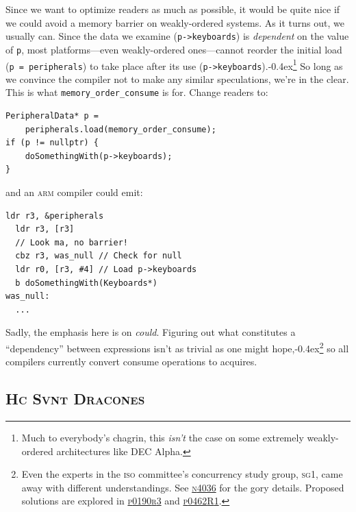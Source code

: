 \documentclass[fontsize=10pt, numbers=endperiod]{scrartcl}
\newcommand{\codesize}{\fontsize{10pt}{12pt}}
\newcommand{\punckern}{\kern-0.4ex}
\newcommand{\monobox}[1]{\mbox{\texttt{#1}}}
\newenvironment{colfigure}
  {\par\vspace{1\baselineskip minus 0.5\baselineskip}\noindent\minipage{\linewidth}}
  {\endminipage\vspace*{1\baselineskip minus 0.7\baselineskip}}
\begin{document}
\begin{multicols}{2}
Since we want to optimize readers as much as possible,
it would be quite nice if we could avoid a memory barrier
on weakly-ordered systems.
As it turns out, we usually can.
Since the data we examine (\texttt{p->keyboards})
is \emph{dependent} on the value of \texttt{p},
most platforms---even weakly-ordered ones---cannot reorder the initial
load (\texttt{p = peripherals}) to take place after its use
(\texttt{p->keyboards}).\punckern\footnote{Much to everybody's chagrin,
this \emph{isn't} the case on some extremely weakly-ordered architectures like
DEC Alpha.}
So long as we convince the compiler not to make any similar speculations,
we're in the clear.
This is what \monobox{memory\_order\_consume} is for.
Change readers to:
\begin{colfigure}
\begin{verbatim}
PeripheralData* p =
    peripherals.load(memory_order_consume);
if (p != nullptr) {
    doSomethingWith(p->keyboards);
}
\end{verbatim}
\end{colfigure}
and an \textsc{arm} compiler could emit:
\begin{colfigure}
\begin{lstlisting}[language={[ARM]Assembler}]
  ldr r3, &peripherals
  ldr r3, [r3]
  // Look ma, no barrier!
  cbz r3, was_null // Check for null
  ldr r0, [r3, #4] // Load p->keyboards
  b doSomethingWith(Keyboards*)
was_null:
  ...
\end{lstlisting}
\end{colfigure}

Sadly, the emphasis here is on \emph{could}.
Figuring out what constitutes a ``dependency'' between expressions isn't
as trivial as one might hope,\punckern\footnote{Even the experts in
the \textsc{iso} committee's concurrency study group, \textsc{sg}1,
came away with different understandings.
See
\href{http://www.open-std.org/jtc1/sc22/wg21/docs/papers/2014/n4036.pdf}{\textsc{n}4036}
for the gory details.
Proposed solutions are explored in
\href{http://www.open-std.org/jtc1/sc22/wg21/docs/papers/2017/p0190r3.pdf}{\textsc{p}0190\textsc{r}3}
and
\href{http://www.open-std.org/jtc1/sc22/wg21/docs/papers/2017/p0462r1.pdf}{\textsc{p}0462\textsc{R}1}.
}
so all compilers currently convert consume operations to acquires.

\subsection{\textsc{Hc Svnt Dracones}}


\end{multicols}
\end{document}
